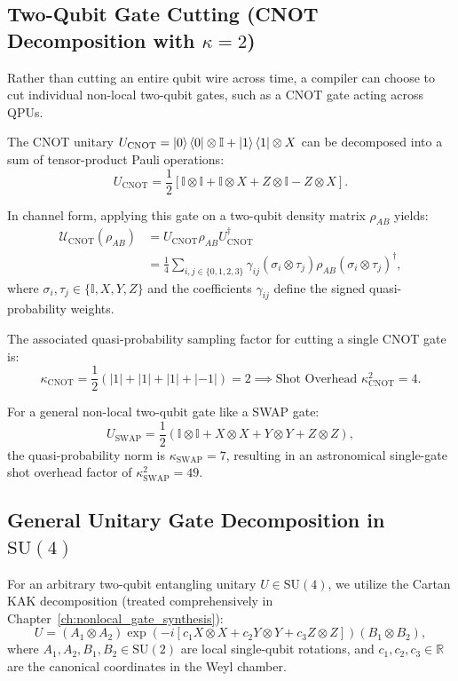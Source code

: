 \subsection{Two-Qubit Gate Cutting (CNOT Decomposition with \texorpdfstring{$\kappa = 2$}{Kappa = 2})}
Rather than cutting an entire qubit wire across time, a compiler can choose to cut individual non-local two-qubit gates, such as a CNOT gate acting across QPUs.

The CNOT unitary $U_{\text{CNOT}} = \ket{0}\bra{0} \otimes \mathbb{I} + \ket{1}\bra{1} \otimes X$ can be decomposed into a sum of tensor-product Pauli operations:
\begin{equation}
    U_{\text{CNOT}} = \frac{1}{2} \left[ \mathbb{I} \otimes \mathbb{I} + \mathbb{I} \otimes X + Z \otimes \mathbb{I} - Z \otimes X \right].
    \label{eq:cnot_pauli_decomposition}
\end{equation}

In channel form, applying this gate on a two-qubit density matrix $\rho_{AB}$ yields:
\begin{align}
    \mathcal{U}_{\text{CNOT}}(\rho_{AB}) &= U_{\text{CNOT}} \rho_{AB} U_{\text{CNOT}}^\dagger \nonumber \\
    &= \frac{1}{4} \sum_{i, j \in \{0, 1, 2, 3\}} \gamma_{ij} (\sigma_i \otimes \tau_j) \rho_{AB} (\sigma_i \otimes \tau_j)^\dagger,
\end{align}
where $\sigma_i, \tau_j \in \{\mathbb{I}, X, Y, Z\}$ and the coefficients $\gamma_{ij}$ define the signed quasi-probability weights.

The associated quasi-probability sampling factor for cutting a single CNOT gate is:
\begin{equation}
    \kappa_{\text{CNOT}} = \frac{1}{2} \left( |1| + |1| + |1| + |-1| \right) = 2 \implies \text{Shot Overhead } \kappa_{\text{CNOT}}^2 = 4.
\end{equation}

For a general non-local two-qubit gate like a SWAP gate:
\begin{equation}
    U_{\text{SWAP}} = \frac{1}{2}(\mathbb{I}\otimes\mathbb{I} + X\otimes X + Y\otimes Y + Z\otimes Z),
\end{equation}
the quasi-probability norm is $\kappa_{\text{SWAP}} = 7$, resulting in an astronomical single-gate shot overhead factor of $\kappa_{\text{SWAP}}^2 = 49$.

\subsection{General Unitary Gate Decomposition in \texorpdfstring{$\mathrm{SU}(4)$}{SU(4)}}
For an arbitrary two-qubit entangling unitary $U \in \mathrm{SU}(4)$, we utilize the Cartan KAK decomposition (treated comprehensively in Chapter~\ref{ch:nonlocal_gate_synthesis}):
\begin{equation}
    U = (A_1 \otimes A_2) \exp\left( -i [c_1 X \otimes X + c_2 Y \otimes Y + c_3 Z \otimes Z] \right) (B_1 \otimes B_2),
\end{equation}
where $A_1, A_2, B_1, B_2 \in \mathrm{SU}(2)$ are local single-qubit rotations, and $c_1, c_2, c_3 \in \mathbb{R}$ are the canonical coordinates in the Weyl chamber.

